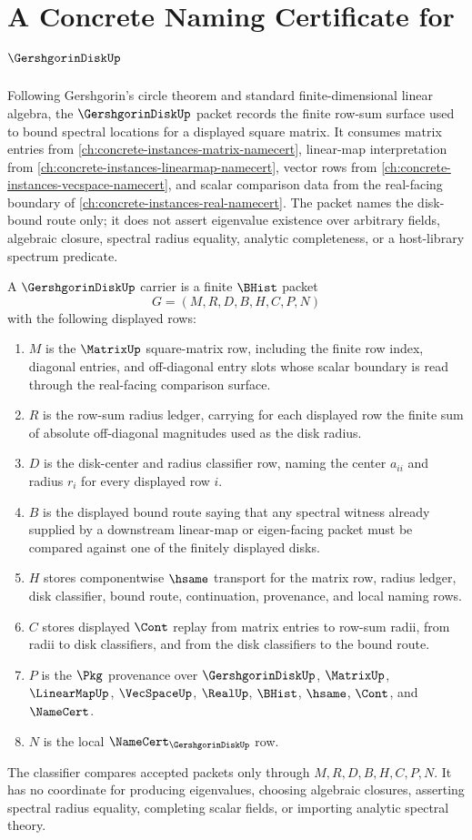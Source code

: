 \chapter{A Concrete Naming Certificate for $\GershgorinDiskUp$}
\label{ch:concrete-instances-gershgorindisk-namecert}

Following Gershgorin's circle theorem and standard finite-dimensional linear algebra, the $\GershgorinDiskUp$ packet records the finite row-sum surface used to bound spectral locations for a displayed square matrix. It consumes matrix entries from \autoref{ch:concrete-instances-matrix-namecert}, linear-map interpretation from \autoref{ch:concrete-instances-linearmap-namecert}, vector rows from \autoref{ch:concrete-instances-vecspace-namecert}, and scalar comparison data from the real-facing boundary of \autoref{ch:concrete-instances-real-namecert}. The packet names the disk-bound route only; it does not assert eigenvalue existence over arbitrary fields, algebraic closure, spectral radius equality, analytic completeness, or a host-library spectrum predicate.

\begin{definition}\label{def:gershgorin-disk-carrier}
A $\GershgorinDiskUp$ carrier is a finite $\BHist$ packet
$$
G=(M,R,D,B,H,C,P,N)
$$
with the following displayed rows:
\begin{enumerate}
\item $M$ is the $\MatrixUp$ square-matrix row, including the finite row index, diagonal entries, and off-diagonal entry slots whose scalar boundary is read through the real-facing comparison surface.
\item $R$ is the row-sum radius ledger, carrying for each displayed row the finite sum of absolute off-diagonal magnitudes used as the disk radius.
\item $D$ is the disk-center and radius classifier row, naming the center $a_{ii}$ and radius $r_i$ for every displayed row $i$.
\item $B$ is the displayed bound route saying that any spectral witness already supplied by a downstream linear-map or eigen-facing packet must be compared against one of the finitely displayed disks.
\item $H$ stores componentwise $\hsame$ transport for the matrix row, radius ledger, disk classifier, bound route, continuation, provenance, and local naming rows.
\item $C$ stores displayed $\Cont$ replay from matrix entries to row-sum radii, from radii to disk classifiers, and from the disk classifiers to the bound route.
\item $P$ is the $\Pkg$ provenance over $\GershgorinDiskUp$, $\MatrixUp$, $\LinearMapUp$, $\VecSpaceUp$, $\RealUp$, $\BHist$, $\hsame$, $\Cont$, and $\NameCert$.
\item $N$ is the local $\NameCert_{\GershgorinDiskUp}$ row.
\end{enumerate}
The classifier compares accepted packets only through $M,R,D,B,H,C,P,N$. It has no coordinate for producing eigenvalues, choosing algebraic closures, asserting spectral radius equality, completing scalar fields, or importing analytic spectral theory.
\end{definition}

